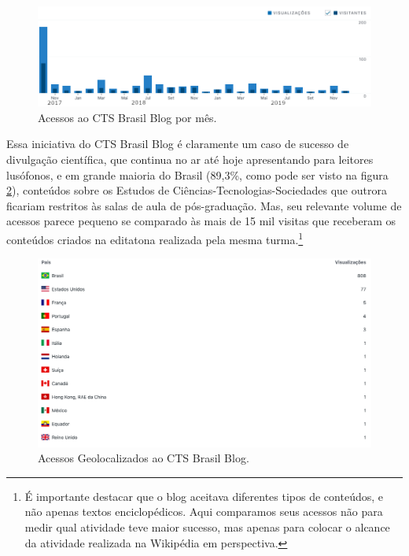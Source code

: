 \begin{figure}[H]
    \centering
    \includegraphics[width=1\textwidth]{Images/acessos-cts-brasil.png}
    \caption{Acessos ao CTS Brasil Blog por mês.}
    \label{fig:acessos-cts-brasil}
\end{figure}

Essa iniciativa do CTS Brasil Blog é claramente um caso de sucesso de divulgação científica, que continua no ar até hoje apresentando para leitores lusófonos, e em grande maioria do Brasil (89,3\%, como pode ser visto na figura \ref{fig:acessos-geo-cts-brasil}), conteúdos sobre os Estudos de Ciências-Tecnologias-Sociedades que outrora ficariam restritos às salas de aula de pós-graduação. Mas, seu relevante volume de acessos parece pequeno se comparado às mais de 15 mil visitas que receberam os conteúdos criados na editatona realizada pela mesma turma.\footnote{É importante destacar que o blog aceitava diferentes tipos de conteúdos, e não apenas textos enciclopédicos. Aqui comparamos seus acessos não para medir qual atividade teve maior sucesso, mas apenas para colocar o alcance da atividade realizada na Wikipédia em perspectiva.}

\begin{figure}[H]
    \centering
    \includegraphics[width=1\textwidth]{Images/acessos-geo-cts-brasil.png}
    \caption{Acessos Geolocalizados ao CTS Brasil Blog.}
    \label{fig:acessos-geo-cts-brasil}
\end{figure}

